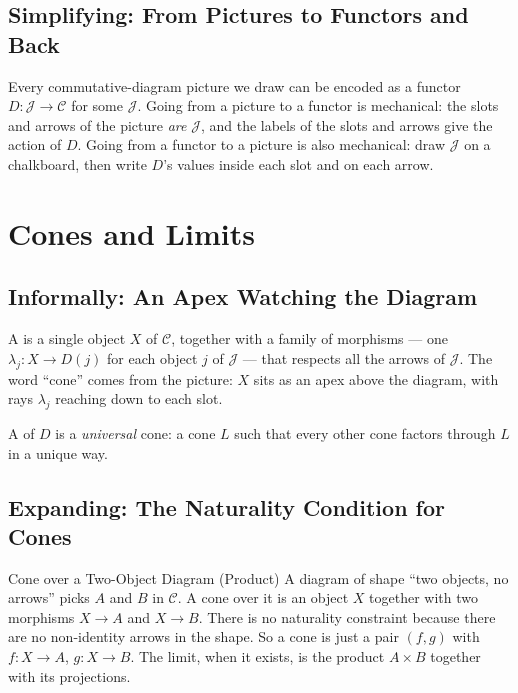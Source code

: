 \subsection{Simplifying: From Pictures to Functors and Back}

Every commutative-diagram picture we draw can be encoded as a functor
$D : \mathcal{J} \to \mathcal{C}$ for some $\mathcal{J}$. Going from a
picture to a functor is mechanical: the slots and arrows of the picture
\emph{are} $\mathcal{J}$, and the labels of the slots and arrows give the
action of $D$. Going from a functor to a picture is also mechanical: draw
$\mathcal{J}$ on a chalkboard, then write $D$'s values inside each slot
and on each arrow.


\section{Cones and Limits}
\label{sec:cones-and-limits}

\subsection{Informally: An Apex Watching the Diagram}

A  is a single object $X$ of $\mathcal{C}$, together
with a family of morphisms --- one $\lambda_j : X \to D(j)$ for each object
$j$ of $\mathcal{J}$ --- that respects all the arrows of $\mathcal{J}$.
The word ``cone'' comes from the picture: $X$ sits as an apex above the
diagram, with rays $\lambda_j$ reaching down to each slot.

A  of $D$ is a \emph{universal} cone: a cone $L$ such that
every other cone factors through $L$ in a unique way.

\subsection{Expanding: The Naturality Condition for Cones}

\begin{example}{Cone over a Two-Object Diagram (Product)}
A diagram of shape ``two objects, no arrows'' picks $A$ and $B$ in
$\mathcal{C}$. A cone over it is an object $X$ together with two
morphisms $X \to A$ and $X \to B$. There is no naturality constraint
because there are no non-identity arrows in the shape. So a cone is just
a pair $(f, g)$ with $f : X \to A$, $g : X \to B$. The limit, when it
exists, is the product $A \times B$ together with its projections.
\end{example}

